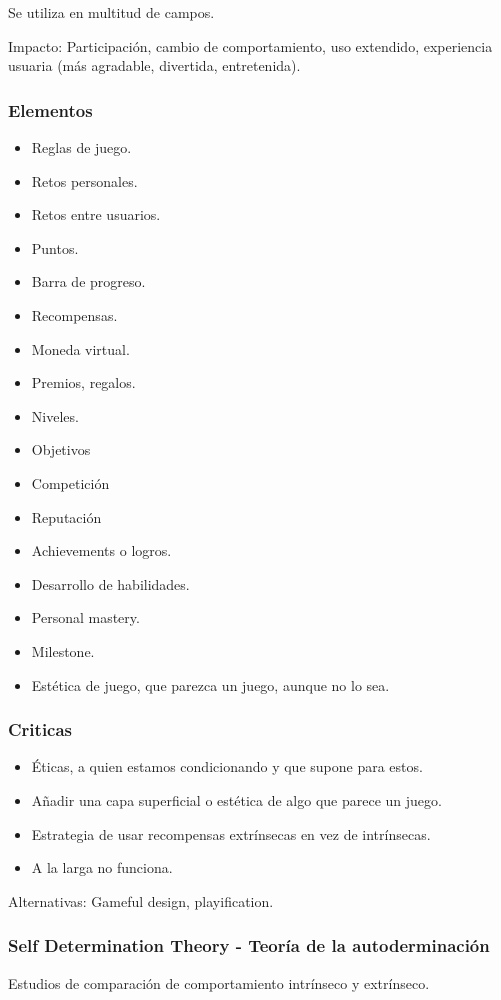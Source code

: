 \documentclass[12pt, twoside, openright]{report} %
\begin{document}
Se utiliza en multitud de campos.

Impacto: Participación, cambio de comportamiento, uso extendido, experiencia usuaria (más agradable, divertida, entretenida).

\subsubsection{Elementos}
\begin{itemize}
	\item Reglas de juego.
	\item Retos personales.
	\item Retos entre usuarios.
	\item Puntos.
	\item Barra de progreso.
	\item Recompensas.
	\item Moneda virtual.
	\item Premios, regalos.
	\item Niveles.
	\item Objetivos
	\item Competición
	\item Reputación
	\item Achievements o logros.
	\item Desarrollo de habilidades.
	\item Personal mastery.
	\item Milestone.
	\item Estética de juego, que parezca un juego, aunque no lo sea.
\end{itemize}

\subsubsection{Criticas}
\begin{itemize}
	\item Éticas, a quien estamos condicionando y que supone para estos.
	\item Añadir una capa superficial o estética de algo que parece un juego.
	\item Estrategia de usar recompensas extrínsecas en vez de intrínsecas.
	\item A la larga no funciona.
\end{itemize}
Alternativas: Gameful design, playification.

\subsubsection{Self Determination Theory - Teoría de la autoderminación}
Estudios de comparación de comportamiento intrínseco y extrínseco.
\end{document}
